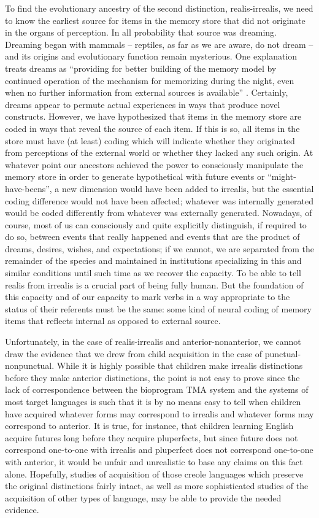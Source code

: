 To find the evolutionary ancestry of the second distinction, realis-irrealis, we need to know the earliest source for items in the memory store that did not originate in the organs of perception. In all probability that source was dreaming. Dreaming began with mammals -- reptiles, as far as we are aware, do not dream -- and its origins and evolutionary function remain mysterious. One explanation treats dreams as ``providing for better building of the memory model by continued operation of the mechanism for memorizing during the night, even when no further information from external sources is available'' \citep[209]{Young1978}. Certainly, dreams appear to permute actual experiences in ways that produce novel constructs. However, we have hypothesized that items in the memory store are coded in ways that reveal the source of each item. If this is so, all items in the store must have (at least) coding which will indicate whether they originated from perceptions
of the external world or whether they lacked any such origin. At whatever point our ancestors achieved the power to consciously manipulate the memory store in order to generate hypothetical with future events or ``might-have-beens'', a new dimension would have been added to irrealis, but the essential coding difference would not have been affected; whatever was internally generated would be coded differently from whatever was externally generated. Nowadays, of course, most of us can consciously and quite explicitly distinguish, if required to do so, between events that really happened and events that are the product of dreams, desires, wishes, and expectations; if we cannot, we are separated from the remainder of the species and maintained in institutions specializing in this and similar conditions until such time as we recover the capacity. To be able to tell realis from irrealis is a crucial part of being fully human. But the foundation of this capacity and of our capacity to mark verbs in a way appropriate to the status of their referents must be the same: some kind of neural coding of memory items that reflects internal as opposed to external source. 

Unfortunately, in the case of realis-irrealis and anterior-nonanterior, we cannot draw the evidence that we drew from child acquisition in the case of punctual-nonpunctual. While it is highly possible that children make irrealis distinctions before they make anterior distinctions, the point is not easy to prove since the lack of correspondence between the bioprogram TMA system and the systems of most target languages is such that it is by no means easy to tell when children have acquired whatever forms may correspond to irrealis and whatever forms may correspond to anterior. It is true, for instance, that children learning English acquire futures long before they acquire pluperfects, but since future does not correspond one-to-one with irrealis and pluperfect does not correspond one-to-one with anterior, it would be unfair and unrealistic to base any claims on this fact alone. Hopefully, studies of acquisition of those creole languages which preserve the original distinctions fairly intact, as well as more sophisticated studies of the acquisition of other types of language, may be able to provide the needed evidence.

